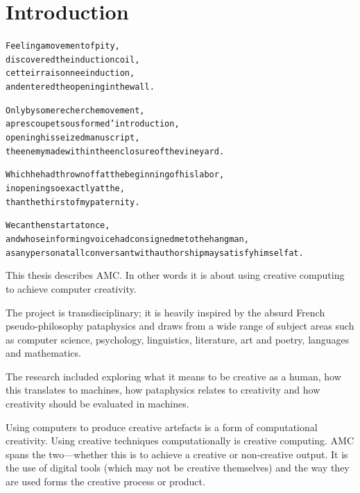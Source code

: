 
\chapter{Introduction}
\label{ch:introduction}

\startcontents[chapters]

\vfill

\begin{alltt}\sffamily
Feeling a movement of pity,
discovered the induction coil,
cette irraisonnee induction,
and entered the opening in the wall.

Only by some recherche movement,
apres coup et sous forme d'introduction,
opening his seized manuscript,
the enemy made within the enclosure of the vineyard.

Which he had thrown off at the beginning of his labor,
in opening so exactly at the,
than the thirst of my paternity.

We can then start at once,
and whose informing voice had consigned me to the hangman,
as any person at all conversant with authorship may satisfy himself at.
\end{alltt}

\newpage
\minicontents
\spirals

This thesis describes \acf{AMC}. In other words it is about using creative computing to achieve computer creativity.

The project is transdisciplinary; it is heavily inspired by the absurd French pseudo-philosophy pataphysics and draws from a wide range of subject areas such as computer science, psychology, linguistics, literature, art and poetry, languages and mathematics.

The research included exploring what it means to be creative as a human, how this translates to machines, how pataphysics relates to creativity and how creativity should be evaluated in machines.

Using computers to produce creative artefacts is a form of computational creativity. Using creative techniques computationally is creative computing. \ac{AMC} spans the two---whether this is to achieve a creative or non-creative output. It is the use of digital tools (which may not be creative themselves) and the way they are used forms the creative process or product. 

